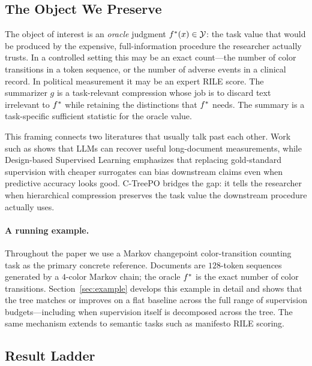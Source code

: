 \subsection{The Object We Preserve}

The object of interest is an \emph{oracle} judgment $f^\ast(x) \in \mathcal{Y}$: the task value that would be produced by the expensive, full-information procedure the researcher actually trusts. In a controlled setting this may be an exact count---the number of color transitions in a token sequence, or the number of adverse events in a clinical record. In political measurement it may be an expert RILE score. The summarizer $g$ is a task-relevant compression whose job is to discard text irrelevant to $f^\ast$ while retaining the distinctions that $f^\ast$ needs. The summary is a task-specific sufficient statistic for the oracle value.

This framing connects two literatures that usually talk past each other. Work such as \citet{BenoitEtAl2025} shows that LLMs can recover useful long-document measurements, while Design-based Supervised Learning \citep{EgamiEtAl2024} emphasizes that replacing gold-standard supervision with cheaper surrogates can bias downstream claims even when predictive accuracy looks good. C-TreePO bridges the gap: it tells the researcher when hierarchical compression preserves the task value the downstream procedure actually uses.

\paragraph{A running example.}
Throughout the paper we use a Markov changepoint color-transition counting task as the primary concrete reference. Documents are $128$-token sequences generated by a $4$-color Markov chain; the oracle $f^\ast$ is the exact number of color transitions. Section~\ref{sec:example} develops this example in detail and shows that the tree matches or improves on a flat baseline across the full range of supervision budgets---including when supervision itself is decomposed across the tree. The same mechanism extends to semantic tasks such as manifesto RILE scoring.

\subsection{Result Ladder}

